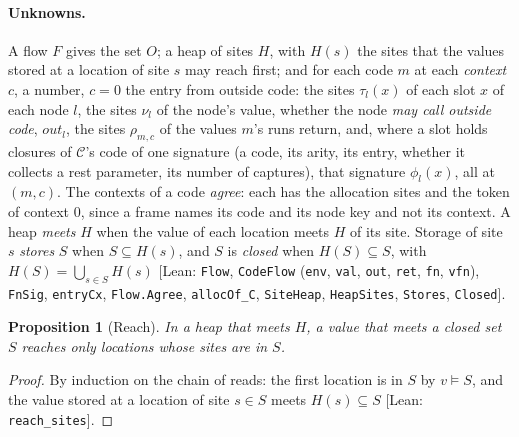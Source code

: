 \documentclass[10pt,a4paper]{article}
\newtheorem{proposition}[theorem]{Proposition}
\theoremstyle{definition}
\theoremstyle{remark}
\newcommand{\lean}[1]{\texttt{\small #1}}
\newcommand{\status}[1]{\textsf{\small[#1]}}
\newcommand{\cC}{\mathcal{C}}
\begin{document}
\paragraph{Unknowns.} A flow $F$ gives the set $O$; a heap of sites
$H$, with $H(s)$ the sites that the values stored at a location of site
$s$ may reach first; and for each code $m$ at each \emph{context} $c$, a
number, $c=0$ the entry from outside code: the sites $\tau_l(x)$ of each
slot $x$ of each node $l$, the sites $\nu_l$ of the node's value, whether
the node \emph{may call outside code}, $\mathit{out}_l$, the sites
$\rho_{m,c}$ of the values $m$'s runs return, and, where a slot holds
closures of $\cC$'s code of one signature (a code, its arity, its entry,
whether it collects a rest parameter, its number of captures), that
signature $\phi_l(x)$, all at $(m,c)$. The contexts of a code
\emph{agree}: each has the allocation sites and the token of context $0$,
since a frame names its code and its node key and not its context. A heap
\emph{meets} $H$ when the value of each location meets $H$ of its site.
Storage of site $s$ \emph{stores} $S$ when $S\subseteq H(s)$, and $S$ is
\emph{closed} when $H(S)\subseteq S$, with $H(S)=\bigcup_{s\in S}H(s)$
\status{Lean: \lean{Flow}, \lean{CodeFlow} (\lean{env}, \lean{val}, \lean{out}, \lean{ret}, \lean{fn}, \lean{vfn}), \lean{FnSig}, \lean{entryCx}, \lean{Flow.Agree}, \lean{allocOf\_C}, \lean{SiteHeap}, \lean{HeapSites}, \lean{Stores}, \lean{Closed}}.

\begin{proposition}[Reach]\label{prop:reach}
In a heap that meets $H$, a value that meets a closed set $S$ reaches only
locations whose sites are in $S$.
\end{proposition}
\begin{proof}
By induction on the chain of reads: the first location is in $S$ by
$v\models S$, and the value stored at a location of site $s\in S$ meets
$H(s)\subseteq S$
\status{Lean: \lean{reach\_sites}}.
\end{proof}
\end{document}
